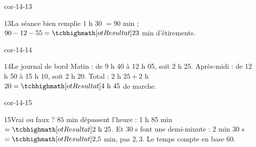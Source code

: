 \begin{blocLivre}{cor-14-13}\begin{corrige}{13}{La séance bien remplie}
$1$ h 30 $=90$ min ; $90-12-55=\res{23}$ min d’étirements.
\end{corrige}\end{blocLivre}
\begin{blocLivre}{cor-14-14}\begin{corrige}{14}{Le journal de bord}
Matin : de 9 h 40 à 12 h 05, soit 2 h 25. Après-midi : de 12 h 50 à 15 h 10, soit 2 h 20. Total : $2$ h $25+2$ h $20=\res{4\ \text h\ 45}$ de marche.
\end{corrige}\end{blocLivre}
\begin{blocLivre}{cor-14-15}\begin{corrige}{15}{Vrai ou faux ?}
$85$ min dépassent l’heure : 1 h 85 min $=\res{2\ \text h\ 25}$. Et 30 s font une demi-minute : 2 min 30 s $=\res{2{,}5}$ min, pas $2{,}3$. Le temps compte en base 60.
\end{corrige}\end{blocLivre}
